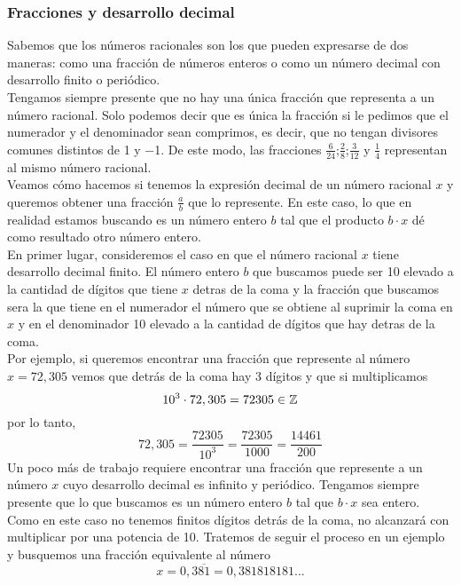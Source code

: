 \documentclass[../Teoría.root.tex]{subfiles}
\begin{document}
        \subsubsection{Fracciones y desarrollo decimal}
        Sabemos que los números racionales son los que pueden expresarse de dos maneras: como una fracción de números enteros o como un número decimal con desarrollo finito o periódico.\\
        Tengamos siempre presente que no hay una única fracción que representa a un número racional. Solo podemos decir que es única la fracción si le pedimos que el numerador y el denominador sean comprimos, es decir, que no tengan divisores comunes distintos de 1 y −1. De este modo, las fracciones \(\frac{6}{24}\);\(\frac{2}{8}\);\(\frac{3}{12}\) y \(\frac{1}{4}\) representan al mismo número racional.\\
        Veamos cómo hacemos si tenemos la expresión decimal de un número racional \(x\) y queremos obtener una fracción \(\frac{a}{b}\) que lo represente. En este caso, lo que en realidad estamos buscando es un número entero \(b\) tal que el producto \(b \cdot x\) dé como resultado otro número entero.\\
        En primer lugar, consideremos el caso en que el número racional \(x\) tiene desarrollo decimal finito. El número entero \(b\) que buscamos puede ser 10 elevado a la cantidad de dígitos que tiene \(x\) detras de la coma y la fracción que buscamos sera la que tiene en el numerador el número que se obtiene al suprimir la coma en \(x\) y en el denominador 10 elevado a la cantidad de dígitos que hay detras de la coma.\\
        Por ejemplo, si queremos encontrar una fracción que represente al número \(x = 72,305\) vemos que detrás de la coma hay 3 dígitos y que si multiplicamos
        \[10^3\cdot72,305=72305\in\mathbb{Z}\] por lo tanto, \[72,305=\frac{72305}{10^3}=\frac{72305}{1000}=\frac{14461}{200}\]
        Un poco más de trabajo requiere encontrar una fracción que represente a un número \(x\) cuyo desarrollo decimal es infinito y periódico. Tengamos siempre presente que lo que buscamos es un número entero \(b\) tal que \(b \cdot x\) sea entero. Como en este caso no tenemos finitos dígitos detrás de la coma, no alcanzará con multiplicar por una potencia de 10. Tratemos de seguir el proceso en un ejemplo y busquemos una fracción equivalente al número \[x=0,3\overline{81}=0,381818181...\]
\end{document}
